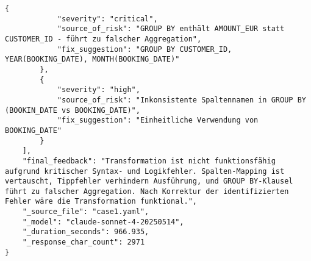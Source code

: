 \begin{lstlisting}[caption={Ausgabe: Claude Sonnet 4 Anwendungsfall 1 Hauptdurchlauf},label={claude_case1_prompt1}]
        {
            "severity": "critical",
            "source_of_risk": "GROUP BY enthält AMOUNT_EUR statt CUSTOMER_ID - führt zu falscher Aggregation",
            "fix_suggestion": "GROUP BY CUSTOMER_ID, YEAR(BOOKING_DATE), MONTH(BOOKING_DATE)"
        },
        {
            "severity": "high",
            "source_of_risk": "Inkonsistente Spaltennamen in GROUP BY (BOOKIN_DATE vs BOOKING_DATE)",
            "fix_suggestion": "Einheitliche Verwendung von BOOKING_DATE"
        }
    ],
    "final_feedback": "Transformation ist nicht funktionsfähig aufgrund kritischer Syntax- und Logikfehler. Spalten-Mapping ist vertauscht, Tippfehler verhindern Ausführung, und GROUP BY-Klausel führt zu falscher Aggregation. Nach Korrektur der identifizierten Fehler wäre die Transformation funktional.",
    "_source_file": "case1.yaml",
    "_model": "claude-sonnet-4-20250514",
    "_duration_seconds": 966.935,
    "_response_char_count": 2971
}
\end{lstlisting}

